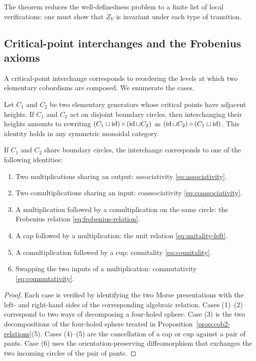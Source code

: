 \noindent The theorem reduces the well-definedness problem to a finite list of local verifications: one must show that $Z_V$ is invariant under each type of transition.

\subsection{Critical-point interchanges and the Frobenius axioms}

A critical-point interchange corresponds to reordering the levels at which two elementary cobordisms are composed. We enumerate the cases.

\begin{lemma}\label{lem:interchange-moves}
Let $C_1$ and $C_2$ be two elementary generators whose critical points have adjacent heights. If $C_1$ and $C_2$ act on disjoint boundary circles, then interchanging their heights amounts to rewriting $(C_1 \sqcup \operatorname{id}) \circ (\operatorname{id} \sqcup C_2)$ as $(\operatorname{id} \sqcup C_2) \circ (C_1 \sqcup \operatorname{id})$. This identity holds in any symmetric monoidal category.

If $C_1$ and $C_2$ share boundary circles, the interchange corresponds to one of the following identities:
\begin{enumerate}
\item Two multiplications sharing an output: associativity \eqref{eq:associativity}.
\item Two comultiplications sharing an input: coassociativity \eqref{eq:coassociativity}.
\item A multiplication followed by a comultiplication on the same circle: the Frobenius relation \eqref{eq:frobenius-relation}.
\item A cap followed by a multiplication: the unit relation \eqref{eq:unitality-left}.
\item A comultiplication followed by a cup: counitality \eqref{eq:counitality}.
\item Swapping the two inputs of a multiplication: commutativity \eqref{eq:commutativity}.
\end{enumerate}
\end{lemma}

\begin{proof}
Each case is verified by identifying the two Morse presentations with the left- and right-hand sides of the corresponding algebraic relation. Cases (1)--(2) correspond to two ways of decomposing a four-holed sphere. Case (3) is the two decompositions of the four-holed sphere treated in Proposition~\ref{prop:cob2-relations}(5). Cases (4)--(5) are the cancellation of a cap or cup against a pair of pants. Case (6) uses the orientation-preserving diffeomorphism that exchanges the two incoming circles of the pair of pants.
\end{proof}

